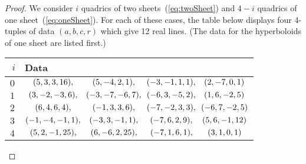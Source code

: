 \begin{proof}
We consider $i$ quadrics of two sheets~(\ref{eq:twoSheet}) and $4-i$
quadrics of one sheet~(\ref{eq:oneSheet}).
For each of these cases, the table below displays four 4-tuples of data
$(a,b,c,r)$ which give 12 real lines.
(The data for the hyperboloids of one sheet are listed first.)
\begin{center}
\begin{tabular}{|c|l|}\hline
$\;i$\;&\hspace{13em}Data\\\hline
$0$&$\hspace{.915em}(5,3,3,16),\hspace{2.185em}(5,-4,2,1),\hspace{1.27em}
                             (-3,-1,1,1),\hspace{.88em}(2,-7,0,1)$\\\hline
$1$&$\hspace{.385em}(3,-2,-3,6),\hspace{.885em}(-3,-7,-6,7),\hspace{.5em}
                            (-6,3,-5,2),\hspace{.865em}(1,6,-2,5)$\\\hline
$2$&$\hspace{1.165em}(6,4,6,4),\hspace{2.43em}(-1,3,3,6),\hspace{1.265em}
                             (-7,-2,3,3),\hspace{.5em}(-6,7,-2,5)$\\\hline
$3$&$(-1,-4,-1,1),\hspace{.885em}(-3,3,-1,1),\hspace{.885em}
              \hspace{.4em}(-7,6,2,9),\hspace{1.025em}(5,6,-1,12)$\\\hline
$4$&$\hspace{.525em}(5,2,-1,25),\hspace{1.555em}(6,-6,2,25),\hspace{1.03em}
                 \hspace{.4em}(-7,1,6,1),\hspace{1.65em}(3,1,0,1)$\\\hline
\end{tabular}
\end{center}





\end{proof}
